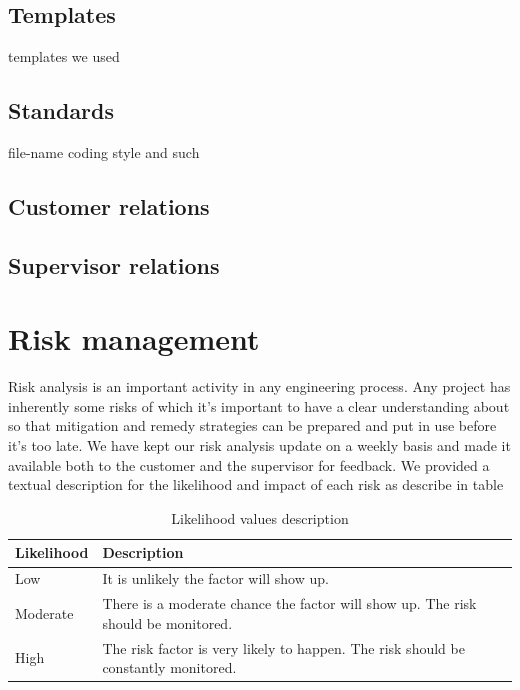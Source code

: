 \subsection{Templates}
templates we used
\subsection{Standards}
file-name coding style and such
\subsection{Customer relations}
\subsection{Supervisor relations}

\section{Risk management}
\label{section:risk}

Risk analysis is an important activity in any engineering process.
Any project has inherently some risks of which it's important to have a clear
understanding about so that mitigation and remedy strategies can be prepared
and put in use before it's too late. 
We have kept our risk analysis update on a weekly basis and made it available
both to the customer and the supervisor for feedback. We provided a textual description for the likelihood and impact of each risk
as describe in table


\begin{table}[h]
\begin{tabular}{ | l | p{11.5cm} | }
  \hline
  \textbf{Likelihood} & \textbf{Description} \\
  \hline\noalign{\smallskip}\noalign{\smallskip}\hline
  Low       & It is unlikely the factor will show up. \\
  Moderate  & There is a moderate chance the factor will show up. The risk should be monitored. \\
  High      & The risk factor is very likely to happen. The risk should be constantly monitored. \\
  \hline
\end{tabular}
\caption{Likelihood values description}
\label{table:likelihood}
\end{table}

